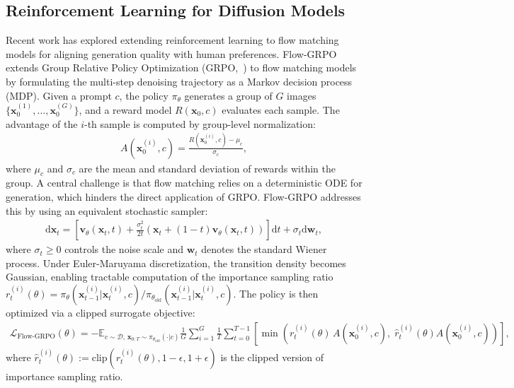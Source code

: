\documentclass{article} %
\renewcommand{\mathbf}[1]{\bm{#1}}
\begin{document}
\subsection{Reinforcement Learning for Diffusion Models}
\label{sec:rl_background}

Recent work has explored extending reinforcement learning to flow matching models for aligning generation quality with human preferences. Flow-GRPO~\citep{liu2025flowgrpo} extends Group Relative Policy Optimization (GRPO,~\citealt{shao2024deepseekmath}) to flow matching models by formulating the multi-step denoising trajectory as a Markov decision process (MDP). Given a prompt $c$, the policy $\pi_\theta$ generates a group of $G$ images $\{\mathbf{x}_0^{(1)}, \ldots, \mathbf{x}_0^{(G)}\}$, and a reward model $R(\mathbf{x}_0, c)$ evaluates each sample. The advantage of the $i$-th sample is computed by group-level normalization:
\begin{align}
    A(\mathbf{x}_0^{(i)}, c) = \frac{R(\mathbf{x}_0^{(i)}, c) - \mu_c}{\sigma_c},
    \label{eq:rl_adv}
\end{align}
where $\mu_c$ and $\sigma_c$ are the mean and standard deviation of rewards within the group. A central challenge is that flow matching relies on a deterministic ODE for generation, which hinders the direct application of GRPO. Flow-GRPO addresses this by using an equivalent stochastic sampler:
\begin{align}
    \mathrm{d}\mathbf{x}_t = \left[\mathbf{v}_\theta(\mathbf{x}_t, t) + \frac{\sigma_t^2}{2t}\left(\mathbf{x}_t + (1-t)\mathbf{v}_\theta(\mathbf{x}_t, t)\right)\right]\mathrm{d}t + \sigma_t \mathrm{d}\mathbf{w}_t,
    \label{eq:flow_sde}
\end{align}
where $\sigma_t\geq0$ controls the noise scale and $\mathbf{w}_t$ denotes the standard Wiener process. Under Euler-Maruyama discretization, the transition density becomes Gaussian, enabling tractable computation of the importance sampling ratio $r_t^{(i)}(\theta) = \pi_\theta(\mathbf{x}_{t-1}^{(i)} | \mathbf{x}_t^{(i)}, c) / \pi_{\theta_\text{old}}(\mathbf{x}_{t-1}^{(i)} | \mathbf{x}_t^{(i)}, c)$.
The policy is then optimized via a clipped surrogate objective:
\begin{align}
    \mathcal{L}_{\text{Flow-GRPO}}(\theta) = -\mathbb{E}_{c\sim\mathcal{D},\,\mathbf{x}_{0:T} \sim \pi_{\theta_{\text{old}}}(\cdot | c)}\frac{1}{G} \sum_{i=1}^{G} \frac{1}{T} \sum_{t=0}^{T-1} \left[\min\!\left(r_t^{(i)}(\theta)\,A(\mathbf{x}_0^{(i)}, c) ,\; \hat{r}_t^{(i)}(\theta)A(\mathbf{x}_0^{(i)}, c) \right) \right],
    \label{eq:flow_grpo_obj}
\end{align}
where $\hat{r}_t^{(i)}(\theta):=\text{clip}\!\left(r_t^{(i)}(\theta), 1{-}\epsilon, 1{+}\epsilon\right)$ is the clipped version of importance sampling ratio. 
\end{document}
